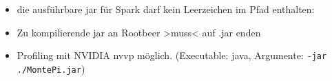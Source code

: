 \begin{frame}[fragile]
\begin{itemize}
        \item die ausführbare jar für Spark darf kein Leerzeichen im Pfad enthalten:
        \item Zu kompilierende jar an Rootbeer >muss< auf .jar enden
        \item Profiling mit NVIDIA nvvp möglich. (Executable: java, Argumente: \lstinline!-jar ./MontePi.jar!)
      \end{itemize}
\end{frame}



